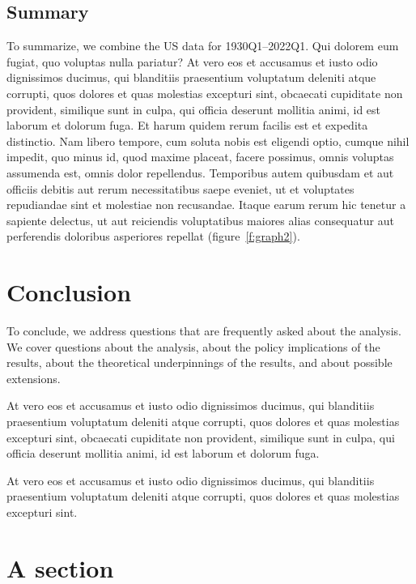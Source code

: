 \documentclass[letterpaper,12pt,leqno]{article}
\newcommand{\bib}{bibliography.bib}
\begin{document}
\subsection{Summary}

To summarize, we combine the US data for 1930Q1--2022Q1. Qui dolorem eum fugiat, quo voluptas nulla pariatur? At vero eos et accusamus et iusto odio dignissimos ducimus, qui blanditiis praesentium voluptatum deleniti atque corrupti, quos dolores et quas molestias excepturi sint, obcaecati cupiditate non provident, similique sunt in culpa, qui officia deserunt mollitia animi, id est laborum et dolorum fuga. Et harum quidem rerum facilis est et expedita distinctio. Nam libero tempore, cum soluta nobis est eligendi optio, cumque nihil impedit, quo minus id, quod maxime placeat, facere possimus, omnis voluptas assumenda est, omnis dolor repellendus. Temporibus autem quibusdam et aut officiis debitis aut rerum necessitatibus saepe eveniet, ut et voluptates repudiandae sint et molestiae non recusandae. Itaque earum rerum hic tenetur a sapiente delectus, ut aut reiciendis voluptatibus maiores alias consequatur aut perferendis doloribus asperiores repellat (figure~\ref{f:graph2}).

\section{Conclusion}\label{s:ccl}

To conclude, we address questions that are frequently asked about the analysis. We cover questions about the analysis, about the policy implications of the results, about the theoretical underpinnings of the results, and about possible extensions.

At vero eos et accusamus et iusto odio dignissimos ducimus, qui blanditiis praesentium voluptatum deleniti atque corrupti, quos dolores et quas molestias excepturi sint, obcaecati cupiditate non provident, similique sunt in culpa, qui officia deserunt mollitia animi, id est laborum et dolorum fuga. 

At vero eos et accusamus et iusto odio dignissimos ducimus, qui blanditiis praesentium voluptatum deleniti atque corrupti, quos dolores et quas molestias excepturi sint.




\newpage
\appendix

\section{A section}\label{a:appendix1}
\end{document}
